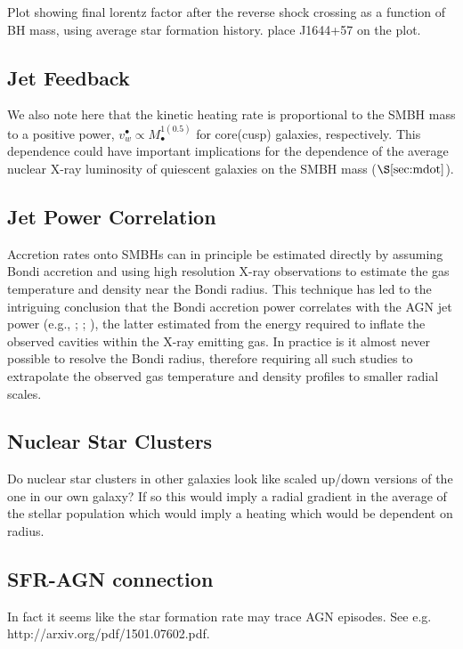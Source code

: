 \documentclass[usenatbib,fleqn]{mn2e}
\begin{document}
Plot showing final lorentz factor after the reverse shock crossing as a function of BH mass, using average star formation history.  place J1644+57 on the plot.

\subsection{Jet Feedback}

We also note
here that the kinetic heating rate is proportional to the SMBH mass to
a positive power, $v_{w}^{\bullet} \propto M_{\bullet}^{1(0.5)}$ for
core(cusp) galaxies, respectively. This dependence could have
important implications for the dependence of the average nuclear X-ray
luminosity of quiescent galaxies on the SMBH mass
($\S\ref{sec:mdot}$).

\subsection{Jet Power Correlation}

Accretion rates onto SMBHs can in principle be estimated directly by
assuming Bondi accretion and using high resolution X-ray observations
to estimate the gas temperature and density near the Bondi radius.
This technique has led to the intriguing conclusion that the Bondi
accretion power correlates with the AGN jet power (e.g.,
\citealt{AllenDunn+:2006a}; \citealt{Russell+13};
\citealt{FujitaKawakatu+:2014a}), the latter estimated from the energy
required to inflate the observed cavities within the X-ray emitting
gas.  In practice is it almost never possible to resolve the Bondi
radius, therefore requiring all such studies to extrapolate the
observed gas temperature and density profiles to smaller radial
scales.

\subsection{Nuclear Star Clusters}
Do nuclear star clusters in other galaxies look like scaled up/down
versions of the one in our own galaxy? If so this would imply a radial
gradient in the average of the stellar population which would imply a
heating which would be dependent on radius.

\subsection{SFR-AGN connection}
In fact it seems like the star formation rate may trace AGN
episodes. See e.g. http://arxiv.org/pdf/1501.07602.pdf. 
\end{document}
